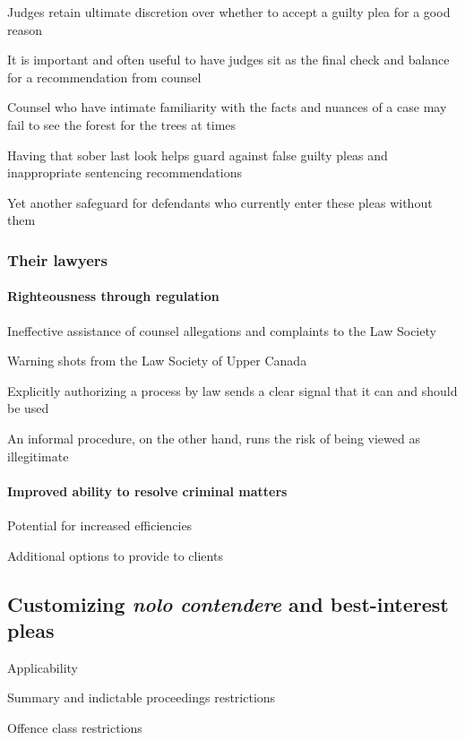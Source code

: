 Judges retain ultimate discretion over whether to accept a guilty plea for a good reason

It is important and often useful to have judges sit as the final check and balance for a recommendation from counsel

Counsel who have intimate familiarity with the facts and nuances of a case may fail to see the forest for the trees at times

Having that sober last look helps guard against false guilty pleas and inappropriate sentencing recommendations

Yet another safeguard for defendants who currently enter these pleas without them

\subsubsection{Their lawyers}
\paragraph{Righteousness through regulation\\}

Ineffective assistance of counsel allegations and complaints to the Law Society

Warning shots from the Law Society of Upper Canada

Explicitly authorizing a process by law sends a clear signal that it can and should be used

An informal procedure, on the other hand, runs the risk of being viewed as illegitimate

\paragraph{Improved ability to resolve criminal matters\\}

Potential for increased efficiencies

Additional options to provide to clients

\subsection{Customizing \textit{nolo contendere} and best-interest pleas}

Applicability

Summary and indictable proceedings restrictions

Offence class restrictions

